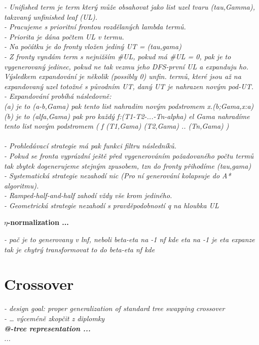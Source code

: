 \documentclass[conference]{IEEEtran}
\begin{document}
\textit{
- Unifished term je term který může obsahovat jako list uzel tvaru (tau,Gamma), takzvaný unfinished leaf (UL).\\
- Pracujeme s prioritní frontou rozdělaných lambda termů.\\ 
- Priorita je dána počtem UL v termu.\\
- Na počátku je do fronty vložen jediný UT = (tau,gama)\\
- Z fronty vyndám term s nejnižším \#UL, pokud má \#UL = 0, pak je to vygenerovaný jedinec, pokud ne tak vezmu jeho DFS-první UL a expanduju ho. Výsledkem expandování je několik (possibly 0) unfin. termů, které jsou až na expandovaný uzel totožné s původním UT, daný UT je nahrazen novým pod-UT. \\
- Expandování probíhá následovně: \\
(a) je to (a-b,Gama) pak tento list nahradim novým podstromem x.(b;Gama,x:a)\\
(b) je to (alfa,Gama) pak pro každý f:(T1-T2-...-Tn-alpha) el Gama 
nahradíme tento list novým podstromem ( f (T1,Gama) (T2,Gama) .. (Tn,Gama) )
\\\\
- Prohledávací strategie má pak funkci filtru následníků. \\
- Pokud se fronta vyprázdní ještě před vygenerováním požadovaného 
  počtu termů tak zbytek dogenerujeme stejným zpusobem, tzn do 
  fronty přihodíme (tau,gama)  \\
- Systematická strategie nezahodí nic (Pro ní generování 
  kolapsuje do A* algoritmu).\\
- Ramped-half-and-half zahodí vždy vše krom jediného.\\
- Geometrická strategie nezahodí s pravděpodobností q na hloubka UL \\
}

\textbf{$\eta$-normalization ...}

\textit{- pač je to generovany v lnf, neboli beta-eta na -1 nf kde 
eta na -1 je eta expanze tak je chytrý transformovat 
to do beta-eta nf kde  
}

\section{Crossover}
\textit{- design goal: proper generalization of standard tree 
swapping crossover\\ 
- … výceméně zkopčit z diplomky\\
\textbf{@-tree representation ...}\\
...
}
\end{document}
